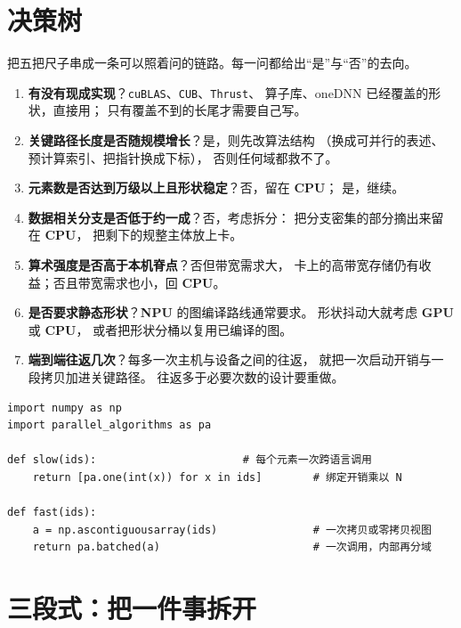 \documentclass[12pt,a4paper,fontset=fandol]{ctexbook}
\newcommand{\Tp}[1]{\texttt{#1}}
\newcommand{\Dom}[1]{\textsf{\bfseries #1}}
\newcommand{\CPU}{\Dom{CPU}}
\newcommand{\GPU}{\Dom{GPU}}
\newcommand{\NPU}{\Dom{NPU}}
\begin{document}
\section{决策树}

把五把尺子串成一条可以照着问的链路。每一问都给出``是''与``否''的去向。

\begin{enumerate}[label=问\arabic*：]
  \item \textbf{有没有现成实现}？\Tp{cuBLAS}、\Tp{CUB}、\Tp{Thrust}、
        算子库、oneDNN 已经覆盖的形状，直接用；
        只有覆盖不到的长尾才需要自己写。
  \item \textbf{关键路径长度是否随规模增长}？是，则先改算法结构
        （换成可并行的表述、预计算索引、把指针换成下标），
        否则任何域都救不了。
  \item \textbf{元素数是否达到万级以上且形状稳定}？否，留在 \CPU{}；
        是，继续。
  \item \textbf{数据相关分支是否低于约一成}？否，考虑拆分：
        把分支密集的部分摘出来留在 \CPU{}，
        把剩下的规整主体放上卡。
  \item \textbf{算术强度是否高于本机脊点}？否但带宽需求大，
        卡上的高带宽存储仍有收益；否且带宽需求也小，回 \CPU{}。
  \item \textbf{是否要求静态形状}？\NPU{} 的图编译路线通常要求。
        形状抖动大就考虑 \GPU{} 或 \CPU{}，
        或者把形状分桶以复用已编译的图。
  \item \textbf{端到端往返几次}？每多一次主机与设备之间的往返，
        就把一次启动开销与一段拷贝加进关键路径。
        往返多于必要次数的设计要重做。
\end{enumerate}

\begin{lstlisting}[style=pythonstyle,caption={绑定边界也会决定放置：批量过界，不要逐个}]
import numpy as np
import parallel_algorithms as pa

def slow(ids):                       # 每个元素一次跨语言调用
    return [pa.one(int(x)) for x in ids]        # 绑定开销乘以 N

def fast(ids):
    a = np.ascontiguousarray(ids)               # 一次拷贝或零拷贝视图
    return pa.batched(a)                        # 一次调用，内部再分域
\end{lstlisting}

\section{三段式：把一件事拆开}
\end{document}
